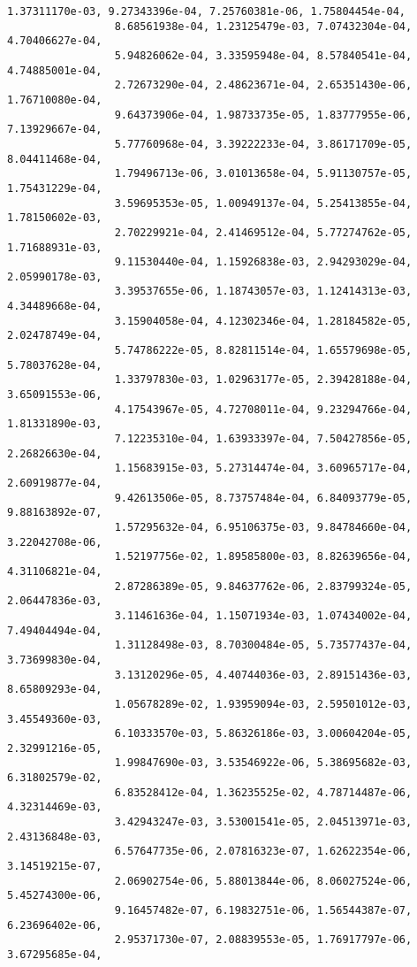 \documentclass[11pt]{article}
\begin{document}
\begin{Verbatim}[commandchars=\\\{\}]
                 1.37311170e-03, 9.27343396e-04, 7.25760381e-06, 1.75804454e-04,
                 8.68561938e-04, 1.23125479e-03, 7.07432304e-04, 4.70406627e-04,
                 5.94826062e-04, 3.33595948e-04, 8.57840541e-04, 4.74885001e-04,
                 2.72673290e-04, 2.48623671e-04, 2.65351430e-06, 1.76710080e-04,
                 9.64373906e-04, 1.98733735e-05, 1.83777955e-06, 7.13929667e-04,
                 5.77760968e-04, 3.39222233e-04, 3.86171709e-05, 8.04411468e-04,
                 1.79496713e-06, 3.01013658e-04, 5.91130757e-05, 1.75431229e-04,
                 3.59695353e-05, 1.00949137e-04, 5.25413855e-04, 1.78150602e-03,
                 2.70229921e-04, 2.41469512e-04, 5.77274762e-05, 1.71688931e-03,
                 9.11530440e-04, 1.15926838e-03, 2.94293029e-04, 2.05990178e-03,
                 3.39537655e-06, 1.18743057e-03, 1.12414313e-03, 4.34489668e-04,
                 3.15904058e-04, 4.12302346e-04, 1.28184582e-05, 2.02478749e-04,
                 5.74786222e-05, 8.82811514e-04, 1.65579698e-05, 5.78037628e-04,
                 1.33797830e-03, 1.02963177e-05, 2.39428188e-04, 3.65091553e-06,
                 4.17543967e-05, 4.72708011e-04, 9.23294766e-04, 1.81331890e-03,
                 7.12235310e-04, 1.63933397e-04, 7.50427856e-05, 2.26826630e-04,
                 1.15683915e-03, 5.27314474e-04, 3.60965717e-04, 2.60919877e-04,
                 9.42613506e-05, 8.73757484e-04, 6.84093779e-05, 9.88163892e-07,
                 1.57295632e-04, 6.95106375e-03, 9.84784660e-04, 3.22042708e-06,
                 1.52197756e-02, 1.89585800e-03, 8.82639656e-04, 4.31106821e-04,
                 2.87286389e-05, 9.84637762e-06, 2.83799324e-05, 2.06447836e-03,
                 3.11461636e-04, 1.15071934e-03, 1.07434002e-04, 7.49404494e-04,
                 1.31128498e-03, 8.70300484e-05, 5.73577437e-04, 3.73699830e-04,
                 3.13120296e-05, 4.40744036e-03, 2.89151436e-03, 8.65809293e-04,
                 1.05678289e-02, 1.93959094e-03, 2.59501012e-03, 3.45549360e-03,
                 6.10333570e-03, 5.86326186e-03, 3.00604204e-05, 2.32991216e-05,
                 1.99847690e-03, 3.53546922e-06, 5.38695682e-03, 6.31802579e-02,
                 6.83528412e-04, 1.36235525e-02, 4.78714487e-06, 4.32314469e-03,
                 3.42943247e-03, 3.53001541e-05, 2.04513971e-03, 2.43136848e-03,
                 6.57647735e-06, 2.07816323e-07, 1.62622354e-06, 3.14519215e-07,
                 2.06902754e-06, 5.88013844e-06, 8.06027524e-06, 5.45274300e-06,
                 9.16457482e-07, 6.19832751e-06, 1.56544387e-07, 6.23696402e-06,
                 2.95371730e-07, 2.08839553e-05, 1.76917797e-06, 3.67295685e-04,

\end{Verbatim}
\end{document}
